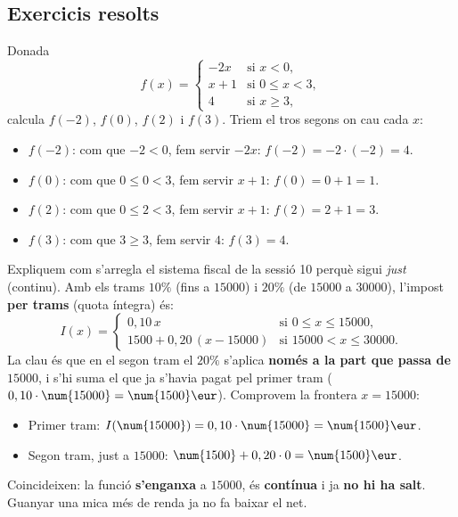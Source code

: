 \subsection{Exercicis resolts}

\begin{exresolt}
Donada
\[
f(x)=
\begin{cases}
-2x & \text{si } x<0,\\[2pt]
x+1 & \text{si } 0\le x<3,\\[2pt]
4 & \text{si } x\ge 3,
\end{cases}
\]
calcula $f(-2)$, $f(0)$, $f(2)$ i $f(3)$.
\solucio
Triem el tros segons on cau cada $x$:
\begin{itemize}[leftmargin=1.4em, itemsep=1pt]
  \item $f(-2)$: com que $-2<0$, fem servir $-2x$: $f(-2)=-2\cdot(-2)=4$.
  \item $f(0)$: com que $0\le 0<3$, fem servir $x+1$: $f(0)=0+1=1$.
  \item $f(2)$: com que $0\le 2<3$, fem servir $x+1$: $f(2)=2+1=3$.
  \item $f(3)$: com que $3\ge 3$, fem servir $4$: $f(3)=4$.
\end{itemize}
\end{exresolt}

\begin{exresolt}
Expliquem com s'arregla el sistema fiscal de la sessió 10 perquè sigui \emph{just}
(continu). Amb els trams $10\%$ (fins a $\num{15000}$) i $20\%$ (de $\num{15000}$ a
$\num{30000}$), l'impost \textbf{per trams} (quota íntegra) és:
\[
I(x)=
\begin{cases}
0,10\,x & \text{si } 0\le x\le \num{15000},\\[2pt]
\num{1500}+0,20\,(x-\num{15000}) & \text{si } \num{15000}< x\le \num{30000}.
\end{cases}
\]
\solucio
La clau és que en el segon tram el $20\%$ s'aplica \textbf{només a la part que passa
de $\num{15000}$}, i s'hi suma el que ja s'havia pagat pel primer tram
($0,10\cdot\num{15000}=\num{1500}\eur$). Comprovem la frontera $x=\num{15000}$:
\begin{itemize}[leftmargin=1.4em, itemsep=1pt]
  \item Primer tram: $I(\num{15000})=0,10\cdot\num{15000}=\num{1500}\eur$.
  \item Segon tram, just a $\num{15000}$: $\num{1500}+0,20\cdot 0=\num{1500}\eur$.
\end{itemize}
Coincideixen: la funció \textbf{s'enganxa} a $\num{15000}$, és \textbf{contínua} i ja
\textbf{no hi ha salt}. Guanyar una mica més de renda ja no fa baixar el net.
\end{exresolt}

